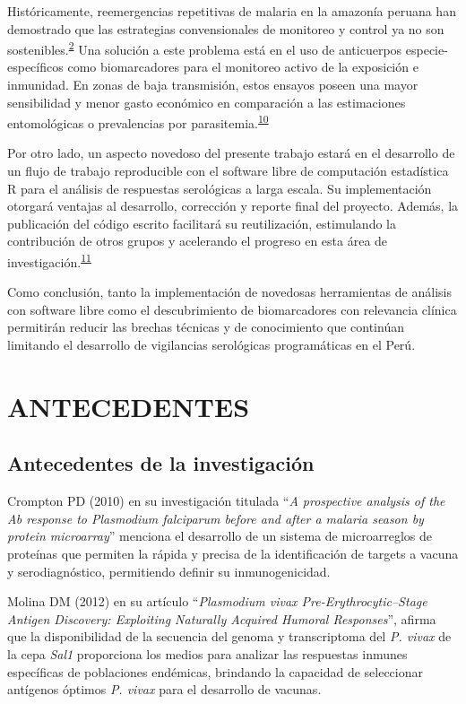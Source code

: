 \documentclass[]{article}
\begin{document}
Históricamente, reemergencias repetitivas de malaria en la amazonía
peruana han demostrado que las estrategias convensionales de monitoreo y
control ya no son
sostenibles.\textsuperscript{\protect\hyperlink{ref-rosas2016peru}{2}}
Una solución a este problema está en el uso de anticuerpos
especie-específicos como biomarcadores para el monitoreo activo de la
exposición e inmunidad. En zonas de baja transmisión, estos ensayos
poseen una mayor sensibilidad y menor gasto económico en comparación a
las estimaciones entomológicas o prevalencias por
parasitemia.\textsuperscript{\protect\hyperlink{ref-elliott2014}{10}}

Por otro lado, un aspecto novedoso del presente trabajo estará en el
desarrollo de un flujo de trabajo reproducible con el software libre de
computación estadística R para el análisis de respuestas serológicas a
larga escala. Su implementación otorgará ventajas al desarrollo,
corrección y reporte final del proyecto. Además, la publicación del
código escrito facilitará su reutilización, estimulando la contribución
de otros grupos y acelerando el progreso en esta área de
investigación.\textsuperscript{\protect\hyperlink{ref-CienciaReproducible2016}{11}}

Como conclusión, tanto la implementación de novedosas herramientas de
análisis con software libre como el descubrimiento de biomarcadores con
relevancia clínica permitirán reducir las brechas técnicas y de
conocimiento que continúan limitando el desarrollo de vigilancias
serológicas programáticas en el Perú.

\section{ANTECEDENTES}\label{antecedentes}

\subsection{Antecedentes de la
investigación}\label{antecedentes-de-la-investigacion}

Crompton PD (2010) en su investigación titulada ``\emph{A prospective
analysis of the Ab response to Plasmodium falciparum before and after a
malaria season by protein microarray}'' menciona el desarrollo de un
sistema de microarreglos de proteínas que permiten la rápida y precisa
de la identificación de targets a vacuna y serodiagnóstico, permitiendo
definir su inmunogenicidad.

Molina DM (2012) en su artículo ``\emph{Plasmodium vivax
Pre-Erythrocytic--Stage Antigen Discovery: Exploiting Naturally Acquired
Humoral Responses}'', afirma que la disponibilidad de la secuencia del
genoma y transcriptoma del \emph{P. vivax} de la cepa \emph{Sal1}
proporciona los medios para analizar las respuestas inmunes específicas
de poblaciones endémicas, brindando la capacidad de seleccionar
antígenos óptimos \emph{P. vivax} para el desarrollo de vacunas.
\end{document}
